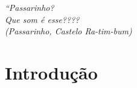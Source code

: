 \documentclass[
	oldfontcommands,
	sumario=tradicional,
	12pt,      %
	openright, %
	oneside,   %
	a4paper,   %
	english, %
	brazil   %
	]{imecc-unicamp}
\begin{document}
			\begin{epigrafe}
				\vspace*{\fill}
				\begin{flushright}
				\textit{``Passarinho? \\
					Que som é esse???? \\
					(Passarinho, Castelo Ra-tim-bum)
				}
				\end{flushright}
			\end{epigrafe}
		
			
		
		
		
		
			
			
			
			\tableofcontents*
			\cleardoublepage
		
		\textual
		
		\chapter{Introdução} \label{cap_intro}
		
		
\end{document}
